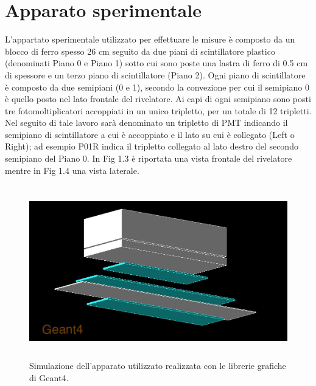 \documentclass{standalone}
\begin{document}
\section{Apparato sperimentale}
L'appartato sperimentale utilizzato per effettuare le misure \`e composto da un blocco di ferro spesso 26 cm seguito da due piani di scintillatore plastico (denominati Piano 0 e Piano 1) sotto cui sono poste una lastra di ferro di 0.5 cm di spessore e un terzo piano di scintillatore (Piano 2).
Ogni piano di scintillatore \`e composto da due semipiani (0 e 1), secondo la convezione per cui il semipiano 0 \`e quello posto nel lato frontale del rivelatore. Ai capi di ogni semipiano sono posti tre fotomoltiplicatori accoppiati in un unico tripletto, per un totale di 12 tripletti. Nel seguito di tale lavoro sar\`a denominato un tripletto di PMT indicando il semipiano di scintillatore a cui \`e accoppiato e il lato su cui \`e collegato (Left o Right); ad esempio P01R indica il tripletto collegato al lato destro del secondo semipiano del Piano 0.
In Fig 1.3 \`e riportata una vista frontale del rivelatore mentre in Fig 1.4 una vista laterale.

\begin{figure}[H]
	\centering
  \includegraphics[width=12cm, height=7.5cm]{images/general.jpg}
  \caption{Simulazione dell'apparato utilizzato realizzata con le librerie grafiche di Geant4.}
\end{figure}
\end{document}
